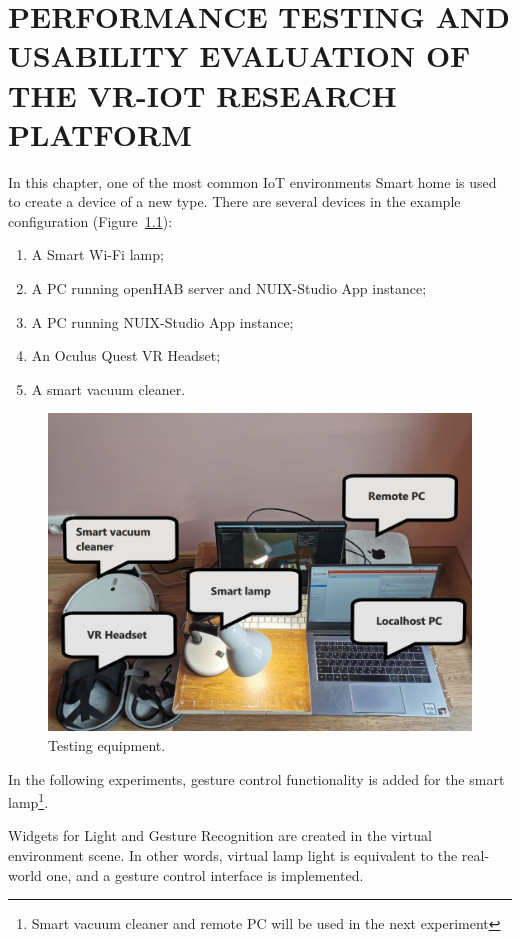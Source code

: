 
\chapter{PERFORMANCE TESTING AND USABILITY EVALUATION OF THE VR-IOT RESEARCH PLATFORM}

In this chapter, one of the most common IoT environments Smart home is used to create a device of a new type. There are several devices in the example configuration (Figure~\ref{fig:TestingEquipment-figure}):
\begin{enumerate}
    \item A Smart Wi-Fi lamp;
    \item A PC running openHAB server and NUIX-Studio App instance;
    \item A PC running NUIX-Studio App instance;
    \item An Oculus Quest VR Headset;
    \item A smart vacuum cleaner.
\end{enumerate}

\begin{figure}
  \centering
  \includegraphics[width = 0.9 \linewidth]{figures/TestingEquipment.png}
  \caption{Testing equipment.}
  \label{fig:TestingEquipment-figure}
\end{figure}

In the following experiments, gesture control functionality is added for the smart lamp\footnote{Smart vacuum cleaner and remote PC will be used in the next experiment}.

Widgets for Light and Gesture Recognition are created in the virtual environment scene. In other words, virtual lamp light is equivalent to the real-world one, and a gesture control interface is implemented.

